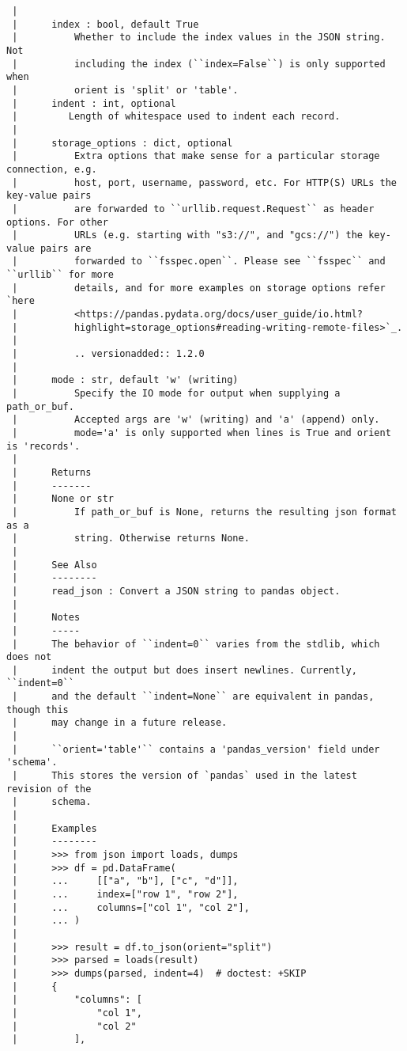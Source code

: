 \documentclass[
  letterpaper,
  DIV=11,
  numbers=noendperiod]{scrreprt}
\begin{document}
\begin{verbatim}
 |      
 |      index : bool, default True
 |          Whether to include the index values in the JSON string. Not
 |          including the index (``index=False``) is only supported when
 |          orient is 'split' or 'table'.
 |      indent : int, optional
 |         Length of whitespace used to indent each record.
 |      
 |      storage_options : dict, optional
 |          Extra options that make sense for a particular storage connection, e.g.
 |          host, port, username, password, etc. For HTTP(S) URLs the key-value pairs
 |          are forwarded to ``urllib.request.Request`` as header options. For other
 |          URLs (e.g. starting with "s3://", and "gcs://") the key-value pairs are
 |          forwarded to ``fsspec.open``. Please see ``fsspec`` and ``urllib`` for more
 |          details, and for more examples on storage options refer `here
 |          <https://pandas.pydata.org/docs/user_guide/io.html?
 |          highlight=storage_options#reading-writing-remote-files>`_.
 |      
 |          .. versionadded:: 1.2.0
 |      
 |      mode : str, default 'w' (writing)
 |          Specify the IO mode for output when supplying a path_or_buf.
 |          Accepted args are 'w' (writing) and 'a' (append) only.
 |          mode='a' is only supported when lines is True and orient is 'records'.
 |      
 |      Returns
 |      -------
 |      None or str
 |          If path_or_buf is None, returns the resulting json format as a
 |          string. Otherwise returns None.
 |      
 |      See Also
 |      --------
 |      read_json : Convert a JSON string to pandas object.
 |      
 |      Notes
 |      -----
 |      The behavior of ``indent=0`` varies from the stdlib, which does not
 |      indent the output but does insert newlines. Currently, ``indent=0``
 |      and the default ``indent=None`` are equivalent in pandas, though this
 |      may change in a future release.
 |      
 |      ``orient='table'`` contains a 'pandas_version' field under 'schema'.
 |      This stores the version of `pandas` used in the latest revision of the
 |      schema.
 |      
 |      Examples
 |      --------
 |      >>> from json import loads, dumps
 |      >>> df = pd.DataFrame(
 |      ...     [["a", "b"], ["c", "d"]],
 |      ...     index=["row 1", "row 2"],
 |      ...     columns=["col 1", "col 2"],
 |      ... )
 |      
 |      >>> result = df.to_json(orient="split")
 |      >>> parsed = loads(result)
 |      >>> dumps(parsed, indent=4)  # doctest: +SKIP
 |      {
 |          "columns": [
 |              "col 1",
 |              "col 2"
 |          ],

\end{verbatim}
\end{document}

